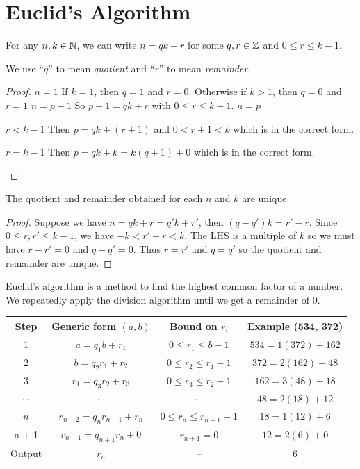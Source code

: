 \documentclass[../main.tex]{subfiles}
\begin{document}
\section{Euclid's Algorithm}
\begin{proposition}
  For any $n, k \in \mathbb{N}$, we can write $n = qk + r$ for some $q, r \in \mathbb{Z}$ and $0 \leq r \leq k - 1$. \label{divisionAlgorithm}
\end{proposition}
\begin{remark}[Notation]
  We use ``$q$'' to mean \textit{quotient} and ``$r$'' to mean \textit{remainder}.
\end{remark}
\begin{proof}
  \induction
  {$n = 1$}{
    If $k = 1$, then $q = 1$ and $r = 0$.
    Otherwise if $k > 1$, then $q = 0$ and $r = 1$
  }
  {$n = p - 1$}{
    So $p - 1= qk + r$ with $0 \leq r \leq k-1$.
  }
  {$n = p$}{
    \begin{proofcases}
      \begin{case}{$r < k - 1$}
        Then $p = qk + (r + 1)$ and $0 < r + 1 < k$ which is in the correct form.
      \end{case}
      \begin{case}{$r = k - 1$}
        Then $p = qk + k = k(q + 1) + 0$ which is in the correct form.
      \end{case}
    \end{proofcases}
  }
\end{proof}
\begin{lemma}
  The quotient and remainder obtained for each $n$ and $k$ are unique.
\end{lemma}
\begin{proof}
  Suppose we have $n = qk + r = q' k + r'$, then $(q - q')k = r' - r$.
  Since $0 \leq r, r' \leq k -1$, we have $-k < r' - r < k$.
  The LHS is a multiple of $k$ so we must have $r - r' = 0$ and $q - q' = 0$.
  Thus $r = r'$ and $q = q'$ so the quotient and remainder are unique.
\end{proof}
Euclid's algorithm is a method to find the highest common factor of a number.
We repeatedly apply the division algorithm until we get a remainder of 0.
\begin{center}
\begin{tabular}{c|c|c|c}
  Step & Generic form $(a,b)$ & Bound on $r_{i}$ & Example (534, 372) \\
\hline
1 & $a = q_1 b + r_1$ & $0 \leq r_1 \leq b-1$ & $534 = 1(372) + 162$ \\
2 & $b = q_2 r_1 + r_2$ & $0 \leq r_2 \leq r_1 - 1$ & $372 = 2(162) + 48$ \\
3 & $r_1 = q_3 r_2 + r_3$ & $0 \leq r_3 \leq r_2 - 1$ &$162 = 3(48) + 18$ \\
$\cdots$ & $\cdots$ & $\cdots$ &$48 = 2(18) + 12$ \\
$n$ & $r_{n-2} = q_n r_{n-1} + r_n$ & $0 \leq r_n \leq r_{n-1} - 1$&$18 = 1(12) + 6$ \\
n + 1 & $r_{n-1} = q_{n+1} r_n + 0$ & $r_{n + 1} = 0$ &$12 = 2(6) + 0$ \\
\hline
Output & $r_n$& -- & 6 \\
\end{tabular}
\end{center}
\end{document}
